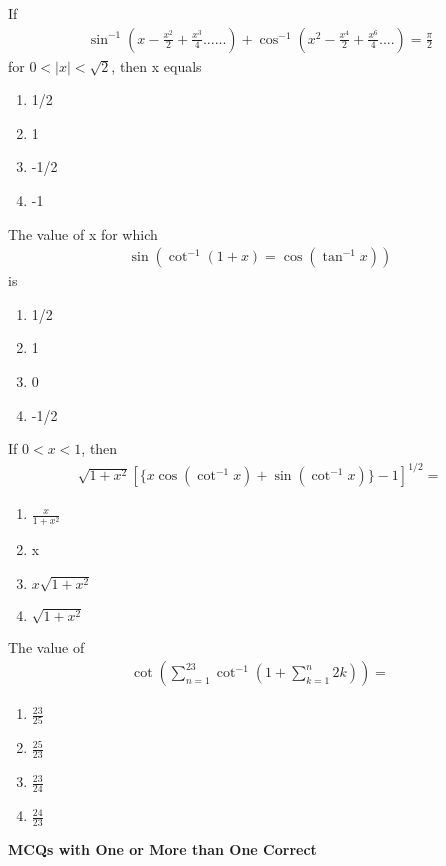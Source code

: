 \item If 
\begin{align*}
\sin^{-1}(x - \frac{x^{2}}{2} + \frac{x^{3}}{4}......) + \cos^{-1}(x^{2} - \frac{x^{4}}{2} + \frac{x^{6}}{4}....) = \frac{\pi}{2} 
\end{align*}
for $0 < |x| < \sqrt{2}$, then x equals
\begin{enumerate}
\item 1/2
\item 1
\item -1/2
\item -1
\end{enumerate}

\item The value of x for which 
\begin{align*}
\sin(\cot^{-1}(1 + x) = \cos(\tan^{-1}x))
\end{align*}
is
\begin{enumerate}
\item 1/2
\item 1
\item 0
\item -1/2
\end{enumerate}

\item If $0 < x < 1$, then 
\begin{align*}
\sqrt{1 + x^2}[\{x\cos(\cot^{-1}x) + \sin(\cot^{-1}x)\} - 1]^{1/2} =
\end{align*}
\begin{enumerate}
\item $\frac{x}{1 + x^2}$
\item x
\item $x\sqrt{1 + x^2}$
\item $\sqrt{1 + x^2}$
\end{enumerate}

\item The value of 
\begin{align*}
\cot(\sum_{n=1}^{23} \cot^{-1}(1 + \sum_{k = 1}^{n}2k))=
\end{align*}
\begin{enumerate}
\item $\frac{23}{25}$
\item $\frac{25}{23}$
\item $\frac{23}{24}$
\item $\frac{24}{23}$
\end{enumerate}

\textbf{MCQs with One or More than One Correct}

